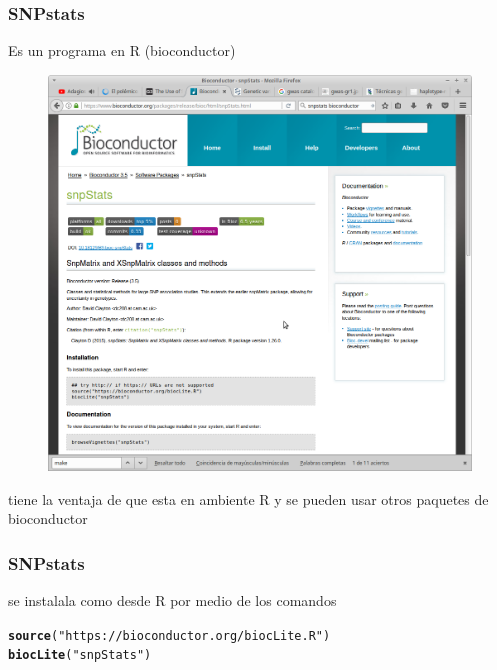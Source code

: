 \documentclass{beamer}\usepackage[]{graphicx}\usepackage[]{color}
\makeatletter
\newcommand{\hlstr}[1]{\textcolor[rgb]{0.192,0.494,0.8}{#1}}%
\newcommand{\hlstd}[1]{\textcolor[rgb]{0.345,0.345,0.345}{#1}}%
\newcommand{\hlkwd}[1]{\textcolor[rgb]{0.737,0.353,0.396}{\textbf{#1}}}%
\newenvironment{kframe}{%
 \def\at@end@of@kframe{}%
 \ifinner\ifhmode%
  \def\at@end@of@kframe{\end{minipage}}%
  \begin{minipage}{\columnwidth}%
 \fi\fi%
 \def\FrameCommand##1{\hskip\@totalleftmargin \hskip-\fboxsep
 \colorbox{shadecolor}{##1}\hskip-\fboxsep
     \hskip-\linewidth \hskip-\@totalleftmargin \hskip\columnwidth}%
 \MakeFramed {\advance\hsize-\width
   \@totalleftmargin\z@ \linewidth\hsize
   \@setminipage}}%
 {\par\unskip\endMakeFramed%
 \at@end@of@kframe}
\newenvironment{knitrout}{}{} %
\makeatother
\begin{document}
\begin{frame}[fragile]
\frametitle{SNPstats}
Es un programa en R (bioconductor)

\begin{figure}[htbp]
\begin{center}
\includegraphics[width=.6\linewidth]{snpstats.png}
\end{center}
\end{figure}

tiene la ventaja de que esta en ambiente R y se pueden usar otros paquetes de bioconductor
\end{frame}



\begin{frame}[fragile]
\frametitle{SNPstats}

se instalala como desde R por medio de los comandos

\begin{knitrout}\footnotesize
{}\color{fgcolor}\begin{kframe}
\begin{alltt}
\hlkwd{source}\hlstd{(}\hlstr{"https://bioconductor.org/biocLite.R"}\hlstd{)}
\hlkwd{biocLite}\hlstd{(}\hlstr{"snpStats"}\hlstd{)}
\end{alltt}
\end{kframe}
\end{knitrout}
\end{frame}
\end{document}
